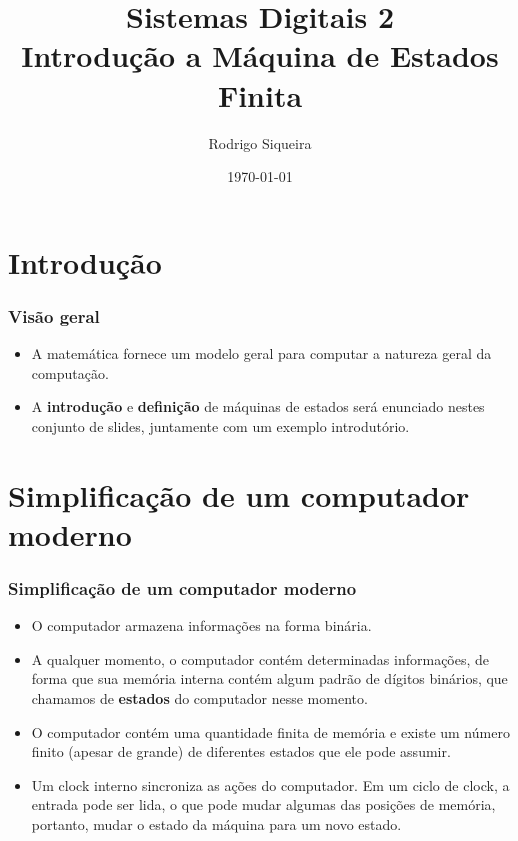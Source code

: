 \documentclass{beamer}
\title{Sistemas Digitais 2\\ \textbf{Introdução a Máquina de Estados Finita}}
\author{Rodrigo Siqueira}
\date{\today}
\institute{\textbf{Universidade de Brasília - Faculdade do Gama}}
\begin{document}
\begin{frame}
  \titlepage
\end{frame}

\section{Introdução}
\begin{frame}
  \frametitle{Visão geral}
  \begin{itemize}
   \item A matemática fornece um modelo geral para computar a natureza geral da 
    computação.
    \pause
   \item A \textbf{introdução} e \textbf{definição} de máquinas de estados
    será enunciado nestes conjunto de slides, juntamente com um exemplo 
    introdutório.
  \end{itemize}
\end{frame}

\section{Simplificação de um computador moderno}

\begin{frame}
  \frametitle{Simplificação de um computador moderno}

  \begin{itemize}
    \item O computador armazena informações na forma binária.
      \pause
    \item A qualquer momento, o computador contém determinadas informações, de 
      forma que sua memória interna contém algum padrão de dígitos binários, 
      que chamamos de \textbf{estados} do computador nesse momento.
      \pause
    \item O computador contém uma quantidade finita de memória e existe um 
      número finito (apesar de grande) de diferentes estados que ele 
      pode assumir.
      \pause
    \item Um clock interno sincroniza as ações do computador. Em um ciclo de
      clock, a entrada pode ser lida, o que pode mudar algumas das posições de 
      memória, portanto, mudar o estado da máquina para um novo estado.
  \end{itemize}

\end{frame}
\end{document}
